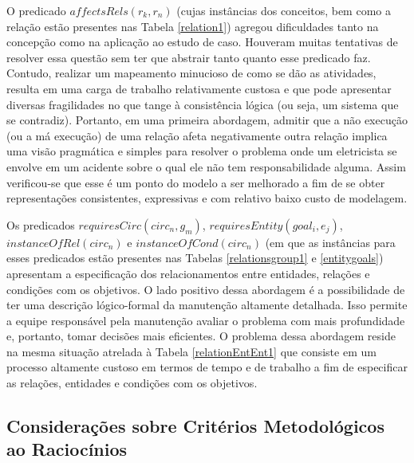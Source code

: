 O predicado $affectsRels(r_k,r_n)$ (cujas instâncias dos conceitos, bem como a relação estão presentes nas Tabela \ref{relation1}) agregou dificuldades tanto na concepção como na aplicação ao estudo de caso. Houveram muitas tentativas de resolver essa questão sem ter que abstrair tanto quanto esse predicado faz. Contudo, realizar um mapeamento minucioso de como se dão as atividades, resulta em uma carga de trabalho relativamente custosa e que pode apresentar diversas fragilidades no que tange à consistência lógica (ou seja, um sistema que se contradiz). Portanto, em uma primeira abordagem, admitir que a não execução (ou a má execução) de uma relação afeta negativamente outra relação implica uma visão pragmática e simples para resolver o problema onde um eletricista se envolve em um acidente sobre o qual ele não tem responsabilidade alguma. Assim verificou-se que esse é um ponto do modelo a ser melhorado a fim de se obter representações consistentes, expressivas e com relativo baixo custo de modelagem. 

Os predicados $requiresCirc(circ_n,g_m)$, $requiresEntity(goal_i, e_j)$, $instanceOfRel(circ_n)$ e $instanceOfCond(circ_n)$ (em que as instâncias para esses predicados estão presentes nas Tabelas \ref{relationsgroup1} e \ref{entitygoals}) apresentam a especificação dos relacionamentos entre entidades, relações e condições com os objetivos. O lado positivo dessa abordagem é a possibilidade de ter uma descrição lógico-formal da manutenção altamente detalhada. Isso permite a equipe responsável pela manutenção avaliar o problema com mais profundidade e, portanto, tomar decisões mais eficientes. O problema dessa abordagem reside na mesma situação atrelada à Tabela \ref{relationEntEnt1} que consiste em um processo altamente custoso em termos de tempo e de trabalho a fim de especificar as relações, entidades e condições com os objetivos. 

\subsection{Considerações sobre Critérios Metodológicos ao Raciocínios} \label{conscritmetrac}

